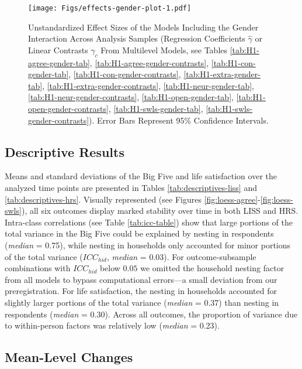 \documentclass[
  english,
  man,floatsintext]{apa7}
\begin{document}
\begin{figure}
\centering
\texttt{[image: Figs/effects-gender-plot-1.pdf]}
\caption{\label{fig:effects-gender-plot}Unstandardized Effect Sizes of the Models Including the Gender Interaction Across Analysis Samples (Regression Coefficients \(\hat{\gamma}\) or Linear Contrasts \(\hat{\gamma}_{c}\) From Multilevel Models, see Tables \ref{tab:H1-agree-gender-tab}, \ref{tab:H1-agree-gender-contrasts}, \ref{tab:H1-con-gender-tab}, \ref{tab:H1-con-gender-contrasts}, \ref{tab:H1-extra-gender-tab}, \ref{tab:H1-extra-gender-contrasts}, \ref{tab:H1-neur-gender-tab}, \ref{tab:H1-neur-gender-contrasts}, \ref{tab:H1-open-gender-tab}, \ref{tab:H1-open-gender-contrasts}, \ref{tab:H1-swls-gender-tab}, \ref{tab:H1-swls-gender-contrasts}). Error Bars Represent 95\% Confidence Intervals.}
\end{figure}

\hypertarget{descriptive-results}{%
\subsection{Descriptive Results}\label{descriptive-results}}

Means and standard deviations of the Big Five and life satisfaction over the analyzed time points are presented in Tables \ref{tab:descriptives-liss} and \ref{tab:descriptives-hrs}. Visually represented (see Figures \ref{fig:loess-agree}-\ref{fig:loess-swls}), all six outcomes display marked stability over time in both LISS and HRS. Intra-class correlations (see Table \ref{tab:icc-table}) show that large portions of the total variance in the Big Five could be explained by nesting in respondents (\emph{median} = 0.75), while nesting in households only accounted for minor portions of the total variance (\(ICC_{hid}\), \emph{median} = 0.03). For outcome-subsample combinations with \(ICC_{hid}\) below \(0.05\) we omitted the household nesting factor from all models to bypass computational errors---a small deviation from our preregistration. For life satisfaction, the nesting in households accounted for slightly larger portions of the total variance (\emph{median} = 0.37) than nesting in respondents (\emph{median} = 0.30). Across all outcomes, the proportion of variance due to within-person factors was relatively low (\emph{median} = 0.23).

\hypertarget{mean-level-changes}{%
\subsection{Mean-Level Changes}\label{mean-level-changes}}
\end{document}
